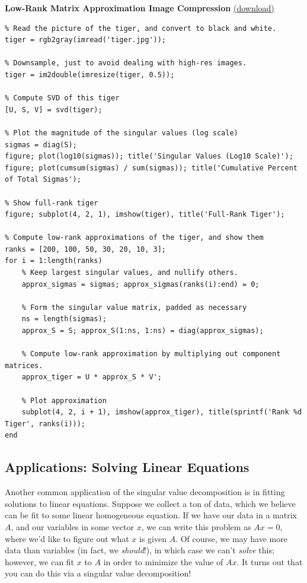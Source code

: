 \documentclass[11pt]{article}
\begin{document}
\textbf{Low-Rank Matrix Approximation Image Compression} \href{http://andrew.gibiansky.com/downloads/code/compress.m}{(download)}
\begin{verbatim}
% Read the picture of the tiger, and convert to black and white.
tiger = rgb2gray(imread('tiger.jpg'));

% Downsample, just to avoid dealing with high-res images.
tiger = im2double(imresize(tiger, 0.5));

% Compute SVD of this tiger
[U, S, V] = svd(tiger);

% Plot the magnitude of the singular values (log scale)
sigmas = diag(S);
figure; plot(log10(sigmas)); title('Singular Values (Log10 Scale)');
figure; plot(cumsum(sigmas) / sum(sigmas)); title('Cumulative Percent of Total Sigmas');

% Show full-rank tiger
figure; subplot(4, 2, 1), imshow(tiger), title('Full-Rank Tiger');

% Compute low-rank approximations of the tiger, and show them
ranks = [200, 100, 50, 30, 20, 10, 3];
for i = 1:length(ranks)
    % Keep largest singular values, and nullify others.
    approx_sigmas = sigmas; approx_sigmas(ranks(i):end) = 0;

    % Form the singular value matrix, padded as necessary
    ns = length(sigmas);
    approx_S = S; approx_S(1:ns, 1:ns) = diag(approx_sigmas);

    % Compute low-rank approximation by multiplying out component matrices.
    approx_tiger = U * approx_S * V';

    % Plot approximation
    subplot(4, 2, i + 1), imshow(approx_tiger), title(sprintf('Rank %d Tiger', ranks(i)));
end
\end{verbatim}

\subsection*{Applications: Solving Linear Equations}

Another common application of the singular value decomposition is in fitting solutions to linear
equations. Suppose we collect a ton of data, which we believe can be fit to some linear homogeneous
equation. If we have our data in a matrix $A$, and our variables in some vector $x$, we can write
this problem as $Ax = 0$, where we'd like to figure out what $x$ is given $A$. Of course, we may
have more data than variables (in fact, we \emph{should}!), in which case we can't \emph{solve}
this; however, we can fit $x$ to $A$ in order to minimize the value of $Ax$. It turns out that you
can do this via a singular value decomposition!
\end{document}
